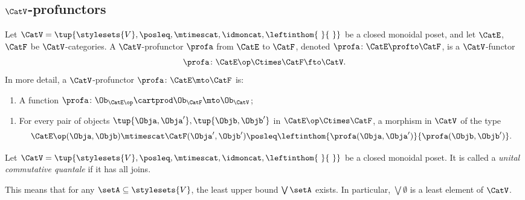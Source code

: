 \subsection{$\CatV$-profunctors}

\begin{ctdefinition}
\label{def:profunctor-monoidal-poset-enriched}
Let $\CatV = \tup{\stylesets{V}, \posleq, \mtimescat, \idmoncat, \leftinthom{\ }{\ }}$ be a closed monoidal poset, and let $\CatE$, $\CatF$ be $\CatV$-categories. A $\CatV$-profunctor $\profa$ from $\CatE$ to $\CatF$, denoted $\profa \colon \CatE \profto \CatF$, is a $\CatV$-functor
\begin{equation}
\profa \colon \CatE\op \Ctimes \CatF \fto \CatV.
\end{equation}
In more detail, a $\CatV$-profunctor $\profa \colon \CatE \mto \CatF$ is:

\constit

\begin{enumerate}
\item A function $\profa \colon \Ob_{\CatE\op} \cartprod \Ob_{\CatF} \mto \Ob_\CatV$;
\end{enumerate}

\condit

\begin{enumerate}
\item For every pair of objects $\tup{\Obja, \Obja'}, \tup{\Objb, \Objb'}$ in $\CatE\op \Ctimes \CatF$, a morphism in $\CatV$ of the type
\begin{equation}
\CatE\op(\Obja, \Objb) \mtimescat \CatF(\Obja', \Objb') \posleq \leftinthom{\profa(\Obja, \Obja')}{\profa(\Objb, \Objb')}.
\end{equation}
\end{enumerate}
\end{ctdefinition}


\begin{ctdefinition}
\label{def:unital-commutative-quantale}
Let $\CatV = \tup{\stylesets{V}, \posleq, \mtimescat, \idmoncat, \leftinthom{\ }{\ }}$ be a closed monoidal poset. It is called a \emph{unital commutative quantale} if it has all joins. 

This means that for any $\setA \subseteq \stylesets{V}$, the least upper bound $\bigvee\setA$ exists. In particular, $\bigvee \emptyset$ is a least element of $\CatV$. 
\end{ctdefinition}

